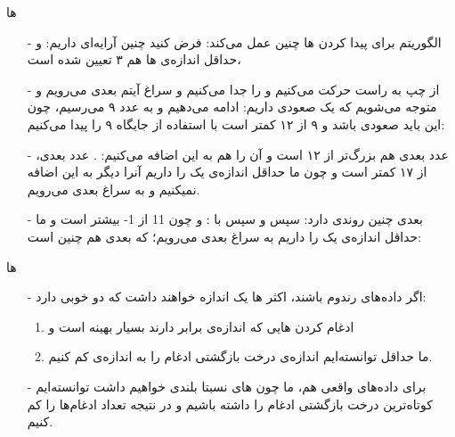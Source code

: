 \begin{frame}{ها}
\begin{itemize}\itemr
\item[-]
الگوریتم برای پیدا کردن ها چنین عمل می‌کند: فرض کنید چنین آرایه‌ای داریم:
\m{\left[8, 12, 9, 17, 15, -1, 22, 11, 10, 7\right]}
و حداقل اندازه‌ی ها هم ۳ تعیین شده است،

\item[-]
از چپ به راست حرکت می‌کنیم و 
\m{\left[8\right]}
را جدا می‌کنیم و سراغ آیتم بعدی می‌رویم و متوجه می‌شویم که یک  صعودی داریم:
\m{\left[8, 12\right]}
ادامه ‌می‌دهیم و به عدد ۹ می‌رسیم، چون این  باید صعودی باشد و ۹ از ۱۲ کمتر است با استفاده از  جایگاه ۹ را پیدا می‌کنیم:
\m{\left[8, 9, 12\right]}

\item[-]
عدد بعدی هم بزرگ‌تر از ۱۲ است و آن را هم به این  اضافه می‌کنیم:
\m{\left[8, 9, 12, 17\right]}.
عدد بعدی، از ۱۷ کمتر است و چون ما حداقل اندازه‌ی یک  را داریم آنرا دیگر به این  اضافه نمیکنیم و به سراغ  بعدی می‌رویم.

\item[-]
 بعدی چنین روندی دارد:
\m{\left[15\right]}
سپس 
\m{\left[15, -1\right]}
و سپس با :
\m{\left[22, 15, -1\right]}
و چون 11 از 1- بیشتر است و ما حداقل اندازه‌ی یک  را داریم به سراغ  بعدی می‌رویم؛ که  بعدی هم چنین است:
\m{\left[11, 10, 7\right]}
\end{itemize}
\end{frame}

\begin{frame}{ها}
\begin{itemize}\itemr
\item[-]
اگر داده‌های رندوم باشند، اکثر ها یک اندازه خواهند داشت که دو خوبی دارد:
\begin{enumerate}\itemr
\item 
ادغام کردن هایی که اندازه‌ی برابر دارند بسیار بهینه است و
\item 
ما حداقل توانسته‌ایم اندازه‌ی درخت بازگشتی ادغام را به اندازه‌ی 
کم کنیم.
\end{enumerate}

\item[-]
برای داده‌های واقعی هم، ما چون های نسبتا بلندی خواهیم داشت توانسته‌ایم کوتاه‌ترین درخت بازگشتی ادغام را داشته باشیم و در نتیجه تعداد ادغام‌ها را کم کنیم.
\end{itemize}
\end{frame}